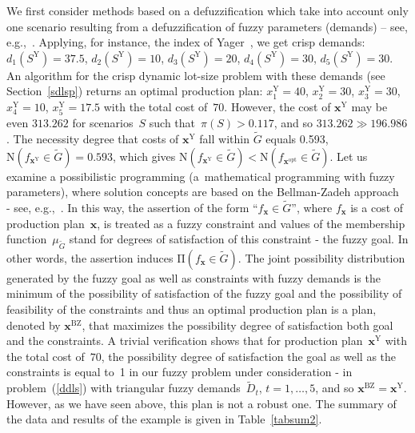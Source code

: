 \documentclass[11pt]{article}
\begin{document}
We first consider methods based on a defuzzification which take into account 
only one scenario resulting  from a defuzzification of fuzzy parameters (demands)
-- see, e.g.,~\cite{PMPV09,PMJB10}.
Applying, for instance, the index of Yager~\cite{Y81},
we get crisp demands: 
 $d_1(S^{\text{Y}})=37.5$, 
$d_2(S^{\text{Y}})=10$, $d_3(S^{\text{Y}})=20$, $d_4(S^{\text{Y}})=30$,
 $d_5(S^{\text{Y}})=30$. An algorithm for the crisp dynamic lot-size problem with
 these demands (see Section~\ref{sdlsp}) returns an optimal production
 plan:
 $x^{\text{Y}}_1=40$, $x^{\text{Y}}_2=30$,  $x^{\text{Y}}_3=30$,
$x^{\text{Y}}_4=10$,  $x^{\text{Y}}_5=17.5$ with the total cost of~$70$.
However,  the cost of $\pmb{x}^{\text{Y}}$  may be even $313.262$ for scenarios~$S$
such that~$\pi(S)>0.117$, and so $313.262\gg 196.986$.
The necessity degree that costs of $\pmb{x}^{\text{Y}}$ fall within 
$\widetilde{G}$ equals 0.593, $\mathrm{N}(f_{\pmb{x}^{\text{Y}}}\in \widetilde{G})=0.593$,
which gives
$\mathrm{N}(f_{\pmb{x}^{\text{Y}}}\in \widetilde{G})<\mathrm{N}(f_{\pmb{x}^{\text{opt}}}\in \widetilde{G})$.
Let us examine 
a possibilistic programming  (a~mathematical programming with fuzzy parameters),
where  solution concepts are based on the Bellman-Zadeh approach~\cite{BZ70}
- see, e.g.,~\cite{MPP10,TRGZ07}. In this way,
the assertion of the form ``$f_{\pmb{x}}\in \widetilde{G}$'', 
where $f_{\pmb{x}}$ is a cost of production plan~$\pmb{x}$, 
is treated as a fuzzy constraint and  values of the membership function~$\mu_{\widetilde{G}}$
stand for
degrees of satisfaction of this constraint - the fuzzy goal. In other words, the assertion induces 
$\mathrm{\Pi}(f_{\pmb{x}}\in \widetilde{G})$.
The joint possibility distribution generated  by the fuzzy goal as well as constraints with fuzzy demands
is the minimum of the possibility of satisfaction of the fuzzy goal and the possibility of
feasibility of the constraints and thus an optimal production plan is a plan, denoted by $\pmb{x}^{\text{BZ}}$,
that maximizes the possibility degree of satisfaction both  goal and the constraints.
A trivial verification shows that for    production
plan~$\pmb{x}^{\text{Y}}$  with  the total cost of~$70$,
the possibility degree of satisfaction the goal as well as the constraints
is equal to~1  in our fuzzy problem under consideration -
in problem~(\ref{ddls}) with triangular fuzzy demands~$\widetilde{D}_t$,
 $t=1,\ldots,5$,  and so $\pmb{x}^{\text{BZ}}=\pmb{x}^{\text{Y}}$.
 However, as we have seen above, this plan is not a robust one.
 The summary of the data and results of the example is given in Table~\ref{tabsum2}.
 
\end{document}
